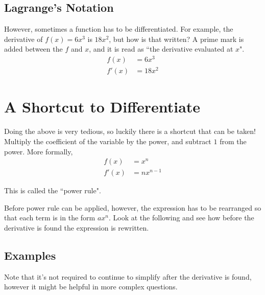 \subsection{Lagrange's Notation}
However, sometimes a function has to be differentiated. For example, the derivative of $f(x) = 6x^3$ is $18x^2$, but how is that written? A prime mark is added between the $f$ and $x$, and it is read as ``the derivative evaluated at $x$".
\begin{align*}
	f(x) &= 6x^3\\
	f'(x) &= 18x^2
\end{align*}


\section{A Shortcut to Differentiate}
Doing the above is very tedious, so luckily there is a shortcut that can be taken! Multiply the coefficient of the variable by the power, and subtract $1$ from the power. More formally,
\begin{align*}
	f(x) &= x^n\\
	f'(x) &= nx^{n-1}
\end{align*}

This is called the ``power rule".

Before power rule can be applied, however, the expression has to be rearranged so that each term is in the form $ax^n$. Look at the following and see how before the derivative is found the expression is rewritten.

\subsection{Examples}
Note that it's not required to continue to simplify after the derivative is found, however it might be helpful in more complex questions.

